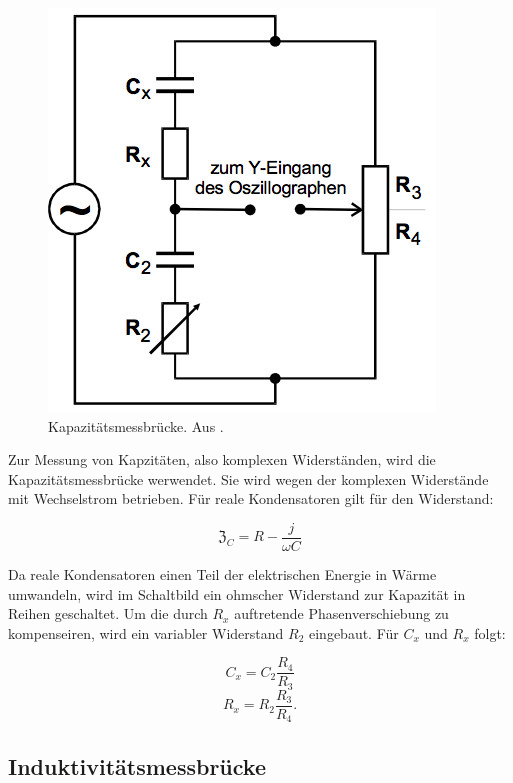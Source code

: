 \begin{figure}
  \centering
  \includegraphics[scale=0.5]{content/kapazitätsbrücke.jpg}
  \caption{Kapazitätsmessbrücke. Aus \cite{anleitung302}.}
  \label{fig:kapazität}
\end{figure}

Zur Messung von Kapzitäten, also komplexen Widerständen, wird die Kapazitätsmessbrücke werwendet. Sie wird wegen der komplexen Widerstände mit Wechselstrom betrieben.
Für reale Kondensatoren gilt für den Widerstand:

\begin{equation}
  \mathfrak{Z}_C = R - \frac{j}{\omega C}
\end{equation}

Da reale Kondensatoren einen Teil der elektrischen Energie in Wärme umwandeln, wird im Schaltbild ein ohmscher Widerstand zur Kapazität in Reihen geschaltet.
Um die durch $R_x$ auftretende Phasenverschiebung zu kompenseiren, wird ein variabler Widerstand $R_{2}$ eingebaut. Für $C_x$ und $R_x$ folgt:

\begin{equation}
  \label{eqn:kapazität1}
  C_x = C_{2} \frac{R_4}{R_3}
\end{equation}
\begin{equation}
  \label{eqn:kapazität2}
  R_x = R_{2} \frac{R_3}{R_4}.
\end{equation}

\subsection{Induktivitätsmessbrücke}

